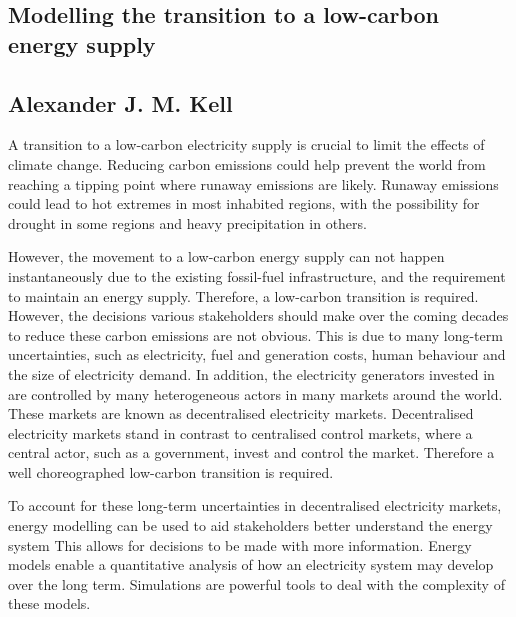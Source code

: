\documentclass[11pt]{report}
\begin{document}
\begin{center}
	

\section*{Modelling the transition to a low-carbon energy supply}
\subsection*{Alexander J. M. Kell}
\end{center}

A transition to a low-carbon electricity supply is crucial to limit the effects of climate change. Reducing carbon emissions could help prevent the world from reaching a tipping point where runaway emissions are likely. Runaway emissions could lead to hot extremes in most inhabited regions, with the possibility for drought in some regions and heavy precipitation in others.




However, the movement to a low-carbon energy supply can not happen instantaneously due to the existing fossil-fuel infrastructure, and the requirement to maintain an energy supply. Therefore, a low-carbon transition is required. However, the decisions various stakeholders should make over the coming decades to reduce these carbon emissions are not obvious. This is due to many long-term uncertainties, such as electricity, fuel and generation costs, human behaviour and the size of electricity demand. In addition, the electricity generators invested in are controlled by many heterogeneous actors in many markets around the world. These markets are known as decentralised electricity markets. Decentralised electricity markets stand in contrast to centralised control markets, where a central actor, such as a government, invest and control the market. Therefore a well choreographed low-carbon transition is required.

To account for these long-term uncertainties in decentralised electricity markets, energy modelling can be used to aid stakeholders better understand the energy system This allows for decisions to be made with more information. Energy models enable a quantitative analysis of how an electricity system may develop over the long term. Simulations are powerful tools to deal with the complexity of these models.
\end{document}
